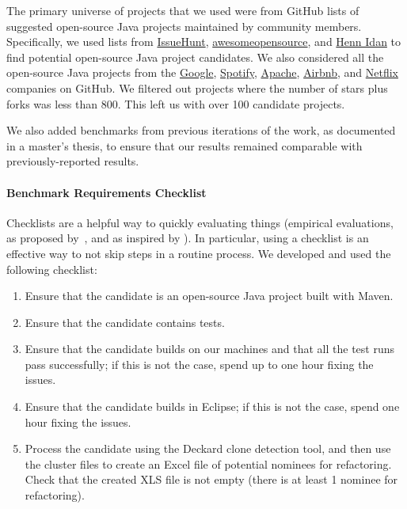 The primary universe of projects that we used were from GitHub lists of suggested open-source Java projects maintained by community members. Specifically, we used lists from \href{https://medium.com/issuehunt/50-top-java-projects-on-github-adbfe9f67dbc}{IssueHunt}, \href{https://awesomeopensource.com/projects/maven-plugin}{awesomeopensource}, and \href{https://www.overops.com/blog/the-hitchhikers-guide-to-github-13-java-projects-you-should-try/}{Henn Idan} to find potential open-source Java project candidates. 
We also considered all the open-source Java projects from the \href{https://github.com/google/?q=&type=&language=java&sort=stargazers}{Google}, \href{https://github.com/spotify/?q=&type=&language=java&sort=stargazers}{Spotify}, \href{https://github.com/apache/?q=&type=&language=java&sort=stargazers}{Apache}, \href{https://github.com/airbnb/?q=&type=&language=java&sort=stargazers}{Airbnb}, and \href{https://github.com/Netflix?q=&type=&language=java&sort=stargazers}{Netflix} companies on GitHub. We filtered out projects where the number of stars plus forks was less than 800. This left us with over 100 candidate projects.

We also added benchmarks from previous iterations of the work, as documented in a master's thesis, to ensure that our results remained comparable with previously-reported results.

\paragraph{Benchmark Requirements Checklist}
Checklists are a helpful way to quickly evaluating things (empirical evaluations, as proposed by~, and as inspired by \cite{gawande09:_check_manif}). In particular, using a checklist is an effective way to not skip steps in a routine process. We developed and used the following checklist:

\begin{enumerate}
  \item Ensure that the candidate is an open-source Java project built with Maven.
  \item Ensure that the candidate contains tests.
  \item Ensure that the candidate builds on our machines and that all the test runs pass successfully; if this is not the case, spend up to one hour fixing the issues.
  \item Ensure that the candidate builds in Eclipse; if this is not the case, spend one hour fixing the issues.
  \item Process the candidate using the Deckard clone detection tool, and then use the cluster files to create an Excel file of potential nominees for refactoring. Check that the created XLS file is not empty (there is at least 1 nominee for refactoring).
\end{enumerate}

